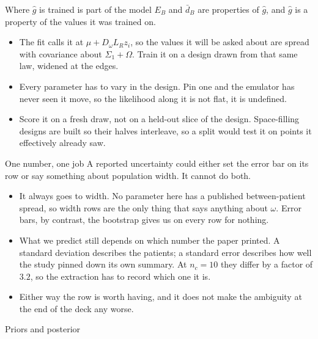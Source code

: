 \documentclass[10pt,aspectratio=169]{beamer}
\begin{document}
\begin{frame}[t]{Where $\widehat g$ is trained is part of the model}
  $E_B$ and $\bar d_B$ are properties of $\widehat g$, and $\widehat g$ is a
  property of the values it was trained on.
  \begin{itemize}\setlength\itemsep{8pt}
    \item The fit calls it at $\mu + D_\omega L_R z_i$, so the values it will be
      asked about are spread with covariance about $\Sigma_1+\Omega$. Train it on
      a design drawn from that same law, widened at the edges.
    \item \alert{Every parameter has to vary in the design.} Pin one and the
      emulator has never seen it move, so the likelihood along it is not flat,
      it is undefined.
    \item Score it on a fresh draw, not on a held-out slice of the design.
      Space-filling designs are built so their halves interleave, so a split
      would test it on points it effectively already saw.
  \end{itemize}
\end{frame}

\begin{frame}[t]{One number, one job}
  A reported uncertainty could either set the error bar on its row or say
  something about population width. It cannot do both.
  \begin{itemize}
    \item \alert{It always goes to width.} No parameter here has a published
      between-patient spread, so width rows are the only thing that says
      anything about $\omega$. Error bars, by contrast, the bootstrap gives us on
      every row for nothing.
    \item What we predict still depends on which number the paper printed. A
      standard deviation describes the patients; a standard error describes how
      well the study pinned down its own summary. \alert{At $n_c=10$ they differ
      by a factor of $3.2$}, so the extraction has to record which one it is.
    \item Either way the row is worth having, and it does not make the ambiguity
      at the end of the deck any worse.
  \end{itemize}
\end{frame}

\begin{frame}[standout]
  Priors and posterior
\end{frame}
\end{document}
